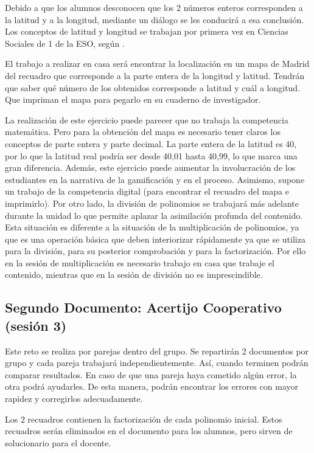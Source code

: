 Debido a que los alumnos desconocen que los 2 números enteros corresponden a la latitud y a la longitud, mediante un diálogo se les conducirá a esa conclusión.
%
Los conceptos de latitud y longitud se trabajan por primera vez en Ciencias Sociales de 1 de la ESO, según \bocm.


El trabajo a realizar en casa será encontrar la localización en un mapa de Madrid del recuadro que corresponde a la parte entera de la longitud y latitud.
%
Tendrán que saber qué número de los obtenidos corresponde a latitud y cuál a longitud.
%
Que impriman el mapa para pegarlo en su cuaderno de investigador.

\Justificacion{}
%
La realización de este ejercicio puede parecer que no trabaja la competencia matemática. 
%
Pero para la obtención del mapa es necesario tener claros los conceptos de parte entera y parte decimal.
%
La parte entera de la latitud es 40, por lo que la latitud real podría ser desde 40,01 hasta 40,99, lo que marca una gran diferencia.
%
Además, este ejercicio puede aumentar la involucración de los estudiantes en la narrativa de la gamificación y en el proceso.
%
Asimismo, supone un trabajo de la competencia digital (para encontrar el recuadro del mapa e imprimirlo).
%
Por otro lado, la división de polinomios se trabajará más adelante durante la unidad lo que permite aplazar la asimilación profunda del contenido.
%
Esta situación es diferente a la situación de la multiplicación de polinomios, ya que es una operación básica que deben interiorizar rápidamente ya que se utiliza para la división, para su posterior comprobación y para la factorización.
%
Por ello en la sesión de multiplicación es necesario trabajo en casa que trabaje el contenido, mientras que en la sesión de división no es imprescindible.


\subsection{Segundo Documento: Acertijo Cooperativo (sesión 3)}
\label{app:ses3:coop}

Este reto se realiza por parejas dentro del grupo.
%
Se repartirán 2 documentos por grupo y cada pareja trabajará independientemente. 
%
Así, cuando terminen podrán comparar resultados. 
%
En caso de que una pareja haya cometido algún error, la otra podrá ayudarles. 
%
De esta manera, podrán encontrar los errores con mayor rapidez y corregirlos adecuadamente.

Los 2 recuadros contienen la factorización de cada polinomio inicial.
%
Estos recuadros serán eliminados en el documento para los alumnos, pero sirven de solucionario para el docente.


